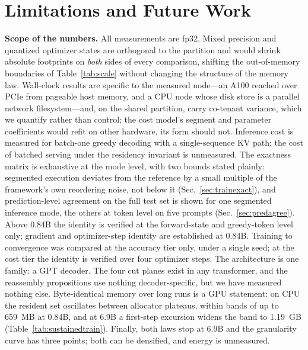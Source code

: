 \documentclass[journal]{IEEEtran}
\begin{document}
\section{Limitations and Future Work}\label{sec:limits}
\textbf{Scope of the numbers.} All measurements are fp32. Mixed precision
and quantized optimizer states are orthogonal to the partition and would
shrink absolute footprints on \emph{both} sides of every comparison,
shifting the out-of-memory boundaries of Table~\ref{tab:scale} without
changing the structure of the memory law. Wall-clock results are specific to the measured node---an A100 reached
over PCIe from pageable host memory, and a CPU node whose disk store is a
parallel network filesystem---and, on the shared partition, carry
co-tenant variance, which we quantify rather than control; the cost
model's segment and parameter coefficients would refit on other hardware,
its form should not. Inference cost is measured for batch-one greedy
decoding with a single-sequence KV path; the cost of batched serving under
the residency invariant is unmeasured. The exactness matrix is exhaustive
at the mode level, with two bounds stated plainly: segmented execution
deviates from the reference by a small multiple of the framework's own
reordering noise, not below it (Sec.~\ref{sec:trainexact}), and
prediction-level agreement on the full test set is shown for one segmented
inference mode, the others at token level on five prompts
(Sec.~\ref{sec:predagree}). Above 0.84B the identity is verified at the
forward-state and greedy-token level only; gradient and optimizer-step
identity are established at 0.84B. Training to convergence was compared at the
accuracy tier only, under a single seed; at the cost tier the identity is
verified over four optimizer steps. The architecture is one family: a GPT
decoder. The four cut planes exist in any transformer, and the
reassembly propositions use nothing decoder-specific, but we have measured nothing else.
Byte-identical memory over long runs is a GPU statement: on CPU the
resident set oscillates between allocator plateaus, within bands of up to
659~MB at 0.84B, and at 6.9B a first-step excursion widens the band to
1.19~GB (Table~\ref{tab:sustainedtrain}).
Finally, both laws stop at 6.9B and the granularity curve
has three points; both can be densified, and energy is unmeasured.
\end{document}
